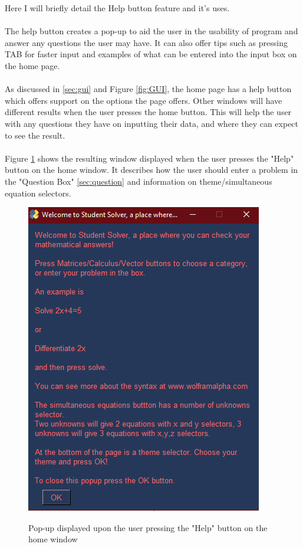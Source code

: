 \documentclass[final]{cmpreport}
\begin{document}
	Here I will briefly detail the Help button feature and it's uses.\\
	\\The help button creates a pop-up to aid the user in the usability of program and answer any questions the user may have. It can also offer tips such as pressing TAB for faster input and examples of what can be entered into the input box on the home page.\\
	\\As discussed in \ref{sec:gui} and Figure \ref{fig:GUI}, the home page has a help button which offers support on the options the page offers. Other windows will have different results when the user presses the home button. This will help the user with any questions they have on inputting their data, and where they can expect to see the result.\\
	\\Figure \ref{fig:helpbutton} shows the resulting window displayed when the user presses the "Help" button on the home window. It describes how the user should enter a problem in the "Question Box" \ref{sec:question} and information on theme/simultaneous equation selectors. 
	\begin{figure}[H]
		\caption{Pop-up displayed upon the user pressing the "Help" button on the home window}
		\centering
		\includegraphics[scale=0.7]{help.png}
		\label{fig:helpbutton}
	\end{figure}
	
\end{document}
